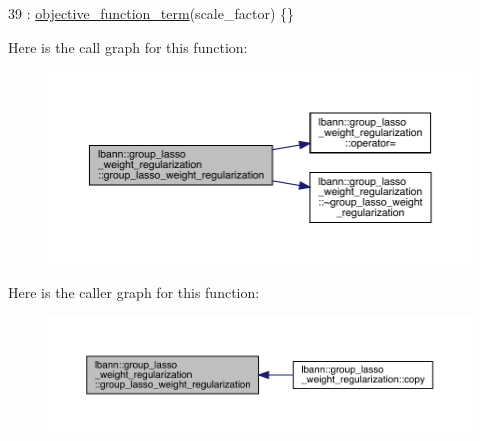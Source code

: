 \begin{DoxyCode}
39     : \hyperlink{classlbann_1_1objective__function__term_a8c019e3c880f38dc20275e395acaeca1}{objective\_function\_term}(scale\_factor) \{\}
\end{DoxyCode}
Here is the call graph for this function\+:\nopagebreak
\begin{figure}[H]
\begin{center}
\leavevmode
\includegraphics[width=350pt]{classlbann_1_1group__lasso__weight__regularization_a6ffca49b19d4adbff300a229ef85ac3b_cgraph}
\end{center}
\end{figure}
Here is the caller graph for this function\+:\nopagebreak
\begin{figure}[H]
\begin{center}
\leavevmode
\includegraphics[width=350pt]{classlbann_1_1group__lasso__weight__regularization_a6ffca49b19d4adbff300a229ef85ac3b_icgraph}
\end{center}
\end{figure}
\mbox{\label{classlbann_1_1group__lasso__weight__regularization_a1b179a63937fe8e3de320707e84920bf}} 
